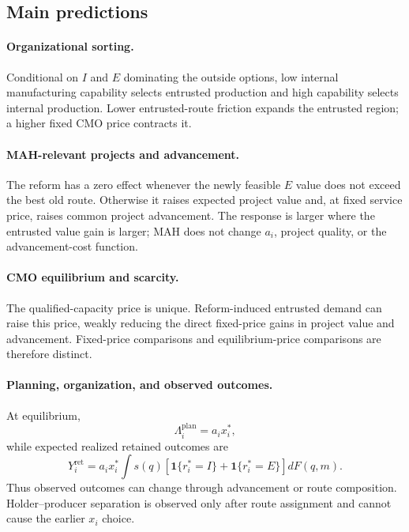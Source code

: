 \documentclass[12pt]{article}
\newcommand{\1}{\mathbf{1}}
\begin{document}
\subsection{Main predictions}
\label{subsec:p16m-predictions}

\paragraph{Organizational sorting.}
Conditional on \(I\) and \(E\) dominating the outside options, low internal
manufacturing capability selects entrusted production and high capability
selects internal production. Lower entrusted-route friction expands the
entrusted region; a higher fixed CMO price contracts it.

\paragraph{MAH-relevant projects and advancement.}
The reform has a zero effect whenever the newly feasible \(E\) value does not
exceed the best old route. Otherwise it raises expected project value and,
at fixed service price, raises common project advancement. The response is
larger where the entrusted value gain is larger; MAH does not change
\(a_i\), project quality, or the advancement-cost function.

\paragraph{CMO equilibrium and scarcity.}
The qualified-capacity price is unique. Reform-induced entrusted demand can
raise this price, weakly reducing the direct fixed-price gains in project
value and advancement. Fixed-price comparisons and equilibrium-price
comparisons are therefore distinct.

\paragraph{Planning, organization, and observed outcomes.}
At equilibrium,
\[
  \Lambda_i^{\mathrm{plan}}=a_ix_i^*,
\]
while expected realized retained outcomes are
\begin{equation}
  Y_i^{\mathrm{ret}}
  =
  a_ix_i^*
  \int s(q)
  \left[
  \mathbf 1\{r_i^*=I\}
  +
  \mathbf 1\{r_i^*=E\}
  \right]dF(q,m).
  \label{eq:p16m-retained-outcome}
\end{equation}
Thus observed outcomes can change through advancement or route composition.
Holder--producer separation is observed only after route assignment and
cannot cause the earlier \(x_i\) choice.
\end{document}
